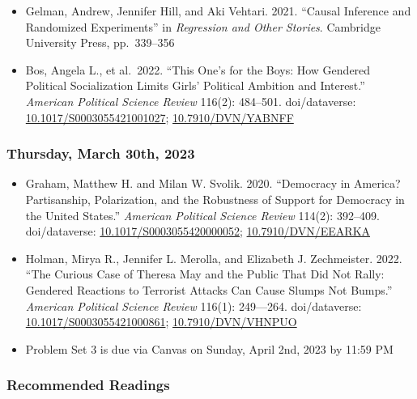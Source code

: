 \documentclass[12pt,]{article}
\begin{document}
\begin{itemize}
\item
  Gelman, Andrew, Jennifer Hill, and Aki Vehtari. 2021. ``Causal
  Inference and Randomized Experiments'' in \emph{Regression and Other
  Stories}. Cambridge University Press, pp.~339--356
\item
  Bos, Angela L., et al.~2022. ``This One's for the Boys: How Gendered
  Political Socialization Limits Girls' Political Ambition and
  Interest.'' \emph{American Political Science Review} 116(2): 484--501.
  doi/dataverse:
  \href{https://doi.org/10.1017/S0003055421001027}{10.1017/S0003055421001027};
  \href{https://dataverse.harvard.edu/dataset.xhtml?persistentId=doi:10.7910/DVN/YABNFF}{10.7910/DVN/YABNFF}
\end{itemize}

\hypertarget{thursday-march-30th-2023}{%
\subsubsection{Thursday, March 30th,
2023}\label{thursday-march-30th-2023}}

\begin{itemize}
\item
  Graham, Matthew H. and Milan W. Svolik. 2020. ``Democracy in America?
  Partisanship, Polarization, and the Robustness of Support for
  Democracy in the United States.'' \emph{American Political Science
  Review} 114(2): 392--409. doi/dataverse:
  \href{https://doi.org/10.1017/S0003055420000052}{10.1017/S0003055420000052};
  \href{https://dataverse.harvard.edu/dataset.xhtml?persistentId=doi:10.7910/DVN/EEARKA}{10.7910/DVN/EEARKA}
\item
  Holman, Mirya R., Jennifer L. Merolla, and Elizabeth J. Zechmeister.
  2022. ``The Curious Case of Theresa May and the Public That Did Not
  Rally: Gendered Reactions to Terrorist Attacks Can Cause Slumps Not
  Bumps.'' \emph{American Political Science Review} 116(1): 249---264.
  doi/dataverse:
  \href{https://doi.org/10.1017/S0003055421000861}{10.1017/S0003055421000861};
  \href{https://dataverse.harvard.edu/dataset.xhtml?persistentId=doi:10.7910/DVN/VHNPUO}{10.7910/DVN/VHNPUO}
\item
  Problem Set 3 is due via Canvas on Sunday, April 2nd, 2023 by 11:59 PM
\end{itemize}

\hypertarget{recommended-readings-7}{%
\subsubsection{Recommended Readings}\label{recommended-readings-7}}
\end{document}
